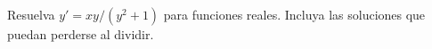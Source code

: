 Resuelva $y'=xy/(y^2+1)$ para funciones reales. Incluya las soluciones que puedan perderse al dividir.
